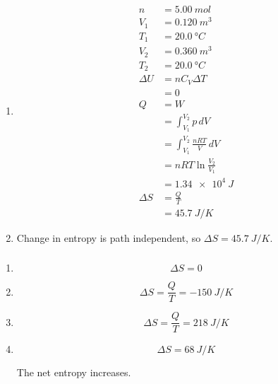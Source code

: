 \documentclass{article}
\begin{document}
\subsubsection{}

\begin{enumerate}
  \item

        \begin{align*}
          n        & = \qty{5.00}{mol}                        \\
          V_1      & = \qty{0.120}{m^3}                       \\
          T_1      & = \qty{20.0}{\degree C}                  \\
          V_2      & = \qty{0.360}{m^3}                       \\
          T_2      & = \qty{20.0}{\degree C}                  \\
          \Delta U & = n C_V \Delta T                         \\
                   & = 0                                      \\
          Q        & = W                                      \\
                   & = \int_{V_1}^{V_2} p \,d V               \\
                   & = \int_{V_1}^{V_2} \frac{n R T}{V} \,d V \\
                   & = n R T \ln \frac{V_2}{V_1}              \\
                   & = \qty{1.34e4}{J}                        \\
          \Delta S & = \frac{Q}{T}                            \\
                   & = \qty{45.7}{J/K}
        \end{align*}

  \item Change in entropy is path independent, so $\Delta S = \qty{45.7}{J/K}$.
\end{enumerate}

\subsubsection{}

\begin{enumerate}
  \item \[\Delta S = 0\]

  \item \[\Delta S = \frac{Q}{T} = \qty{-150}{J/K}\]

  \item \[\Delta S = \frac{Q}{T} = \qty{218}{J/K}\]

  \item \[\Delta S = \qty{68}{J/K}\]

        The net entropy increases.
\end{enumerate}
\end{document}

